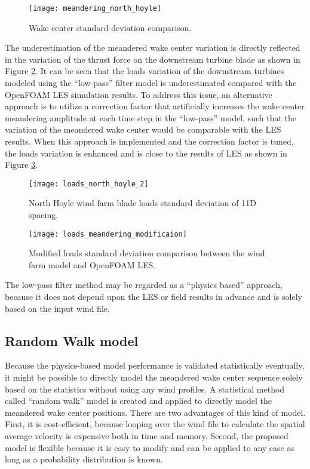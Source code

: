 \documentclass{umthesis}
\begin{document}
\begin{figure}
  \centering
  \texttt{[image: meandering\_north\_hoyle]}
  \caption{Wake center standard deviation comparison.}\label{fig:meandering_north_hoyle1}
\end{figure}

The underestimation of the meandered wake center variation is directly reflected in the variation of the thrust force on the downstream turbine blade as shown in Figure \ref{fig:2_loads_north_hoyle_2}. It can be seen that the loads variation of the downstream turbines modeled using the ``low-pass'' filter model is underestimated compared with the OpenFOAM LES simulation results. To address this issue, an alternative approach is to utilize a correction factor that artificially increases the wake center meandering amplitude at each time step in the ``low-pass'' model, such that the variation of the meandered wake center would be comparable with the LES results. When this approach is implemented and the correction factor is tuned, the loads variation is enhanced and is close to the results of LES as shown in Figure \ref{fig:1_loads_meandering_modificaion}.

\begin{figure}
  \centering
  \texttt{[image: loads\_north\_hoyle\_2]}
  \caption{North Hoyle wind farm blade loads standard deviation of 11D spacing.}\label{fig:2_loads_north_hoyle_2}
\end{figure}

\begin{figure}
  \centering
  \texttt{[image: loads\_meandering\_modificaion]}
  \caption{Modified loads standard deviation comparison between the wind farm model and OpenFOAM LES.}\label{fig:1_loads_meandering_modificaion}
\end{figure}

The low-pass filter method may be regarded as a ``physics based'' approach, because it does not depend upon the LES or field results in advance and is solely based on the input wind file.

\subsection{Random Walk model}
Because the physics-based model performance is validated statistically eventually, it might be possible to directly model the meandered wake center sequence solely based on the statistics without using any wind profiles. A statistical method called ``random walk'' model is created and applied to directly model the meandered wake center positions. There are two advantages of this kind of model. First, it is cost-efficient, because looping over the wind file to calculate the spatial average velocity is expensive both in time and memory. Second, the proposed model is flexible because it is easy to modify and can be applied to any case as long as a probability distribution is known. 
\end{document}
